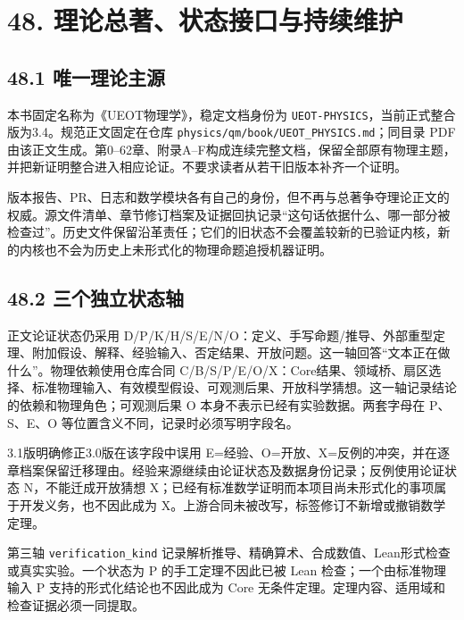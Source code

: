 \documentclass[
  11pt,
  oneside]{book}
\begin{document}
\hypertarget{ch-48}{%
\chapter{48. 理论总著、状态接口与持续维护}\label{ch-48}}

\hypertarget{ux552fux4e00ux7406ux8bbaux4e3bux6e90}{%
\section{48.1 唯一理论主源}\label{ux552fux4e00ux7406ux8bbaux4e3bux6e90}}

本书固定名称为《UEOT物理学》，稳定文档身份为
\texttt{UEOT-PHYSICS}，当前正式整合版为3.4。规范正文固定在仓库
\texttt{physics/qm/book/UEOT\_\allowbreak PHYSICS.md}；同目录 PDF
由该正文生成。第0--62章、附录A--F构成连续完整文档，保留全部原有物理主题，并把新证明整合进入相应论证。不要求读者从若干旧版本补齐一个证明。

版本报告、PR、日志和数学模块各有自己的身份，但不再与总著争夺理论正文的权威。源文件清单、章节修订档案及证据回执记录``这句话依据什么、哪一部分被检查过''。历史文件保留沿革责任；它们的旧状态不会覆盖较新的已验证内核，新的内核也不会为历史上未形式化的物理命题追授机器证明。

\hypertarget{ux4e09ux4e2aux72ecux7acbux72b6ux6001ux8f74}{%
\section{48.2
三个独立状态轴}\label{ux4e09ux4e2aux72ecux7acbux72b6ux6001ux8f74}}

正文论证状态仍采用
D/P/K/H/S/E/N/O：定义、手写命题/推导、外部重型定理、附加假设、解释、经验输入、否定结果、开放问题。这一轴回答``文本正在做什么''。物理依赖使用仓库合同
C/B/S/P/E/O/X：Core结果、领域桥、扇区选择、标准物理输入、有效模型假设、可观测后果、开放科学猜想。这一轴记录结论的依赖和物理角色；可观测后果
O 本身不表示已经有实验数据。两套字母在 P、S、E、O
等位置含义不同，记录时必须写明字段名。

3.1版明确修正3.0版在该字段中误用
E=经验、O=开放、X=反例的冲突，并在逐章档案保留迁移理由。经验来源继续由论证状态及数据身份记录；反例使用论证状态
N，不能迁成开放猜想
X；已经有标准数学证明而本项目尚未形式化的事项属于开发义务，也不因此成为
X。上游合同未被改写，标签修订不新增或撤销数学定理。

第三轴 \texttt{verification\_\allowbreak kind}
记录解析推导、精确算术、合成数值、Lean形式检查或真实实验。一个状态为 P
的手工定理不因此已被 Lean 检查；一个由标准物理输入 P
支持的形式化结论也不因此成为 Core
无条件定理。定理内容、适用域和检查证据必须一同提取。
\end{document}
